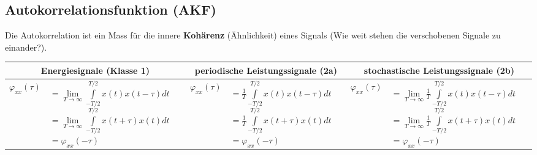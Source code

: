 	\subsection{Autokorrelationsfunktion (AKF) } 
	Die Autokorrelation ist ein Mass für die innere \textbf{Kohärenz} (Ähnlichkeit) eines Signals (Wie weit stehen die verschobenen Signale zu einander?).
		\\
		\bgroup
		\setlength{\tabcolsep}{2mm}
		\begin{tabularx}{\textwidth}{|cX|cX|cX|}
		\hline 
			\multicolumn{2}{|c|}{\textbf{Energiesignale} (Klasse 1)} &
			\multicolumn{2}{|c|}{\textbf{periodische Leistungssignale} (2a)} & 
			\multicolumn{2}{|c|}{\textbf{stochastische Leistungssignale} (2b)}
		\\ \hline 
			$ \varphi_{xx}(\tau) $ &
			$ 		= \lim\limits_{T\to\infty}\int\limits_{-T/2}^{T/2} x(t)x(t-\tau)dt $ \linebreak
				$ 	= \lim\limits_{T\to\infty}\int\limits_{-T/2}^{T/2} x(t+\tau)x(t)dt $ \linebreak
				$	= \varphi_{xx}(-\tau)$ &
			$ \varphi_{xx}(\tau) $ &
			$ 		= \frac {1} {T} \int\limits_{-T/2}^{T/2} x(t)x(t-\tau)dt $ \linebreak
				$	= \frac {1} {T} \int\limits_{-T/2}^{T/2} x(t+\tau)x(t)dt $ \linebreak
				$	= \varphi_{xx}(-\tau) $ &
			$ \varphi_{xx}(\tau) $ &
			$		= \lim\limits_{T\rightarrow\infty} \frac {1} {T} \int\limits_{-T/2}^{T/2} x(t)x(t-\tau)dt $ \linebreak
				$	= \lim\limits_{T\rightarrow\infty}\frac {1} {T} \int\limits_{-T/2}^{T/2} x(t+\tau)x(t)dt $ \linebreak
				$ = \varphi_{xx}(-\tau) $
		\\ \hline
		\end{tabularx} 
		\egroup
		
